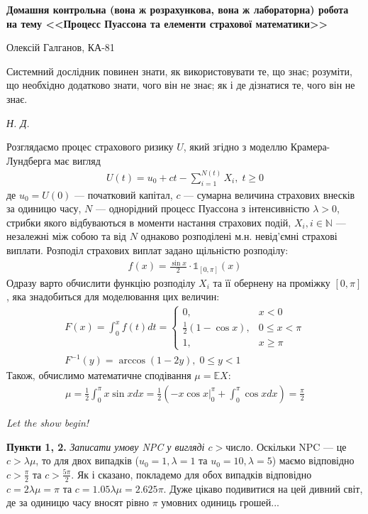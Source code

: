 \documentclass{extreport}
\newcommand{\E}{\mathbb{E}}
\newcommand{\N}{\mathbb{N}}
\newcommand{\task}[1]{\vspace{0.5em}\noindent\textbf{#1.}}
\begin{document}
\begin{center}
    \textbf{Домашня контрольна (вона ж розрахункова, вона ж лабораторна) робота \\
    на тему <<Процесс Пуассона та елементи страхової математики>>}

    Олексій Галганов, КА-81
\end{center}

\epigraph{
    Системний дослідник повинен знати, як використовувати те, що знає; 
    розуміти, що необхідно додатково знати, чого він не знає;
    як і де дізнатися те, чого він не знає.
}{\textit{Н. Д.}}

Розглядаємо процес страхового ризику $U$, який згідно з моделлю Крамера-Лундберга має вигляд
\begin{gather}
    U(t) = u_0 + ct - \sum_{i=1}^{N(t)} X_i, \; t \geq 0
\end{gather}
де $u_0 = U(0)$ --- початковий капітал, $c$ --- сумарна величина страхових внесків за одиницю часу,
$N$ --- однорідний процесс Пуассона з інтенсивністю $\lambda > 0$, стрибки якого відбуваються в моменти настання страхових подій,
$X_i, i \in \N$ --- незалежні між собою та від $N$ однаково розподілені м.н. невід'ємні страхові виплати. Розподіл страхових виплат задано
щільністю розподілу:
\begin{gather}
    f(x) = \frac{\sin x}{2} \cdot \mathds{1}_{[0,\pi]}(x)
\end{gather}
Одразу варто обчислити функцію розподілу $X_i$ та її обернену на проміжку $[0, \pi]$, яка знадобиться для моделювання цих величин:
\begin{gather}
    F(x) = \int_0^x f(t) dt = \begin{cases}
        0, & x < 0 \\
        \frac{1}{2} \left(1 - \cos x\right), & 0 \leq x < \pi \\
        1, & x \geq \pi
    \end{cases} \\
    F^{-1}(y) =  \arccos(1-2y), \; 0 \leq y < 1 
\end{gather}
Також, обчислимо математичне сподівання $\mu = \E X$:
\begin{gather*}
    \mu = \frac{1}{2}\int_0^\pi x \sin x dx = \frac{1}{2} \left(
        - \left. x \cos x \right|_0^\pi + \int_0^\pi \cos x dx
    \right) = \frac{\pi}{2}
\end{gather*}

\textit{Let the show begin!}
\newpage

\task{Пункти 1, 2} \emph{Записати умову NPC у вигляді $c > \text{число}$.} Оскільки NPC --- це $c > \lambda \mu$, то для
двох випадків ($u_0 = 1, \lambda = 1$ та $u_0 = 10, \lambda = 5$) маємо відповідно 
$c > \frac{\pi}{2}$ та $c > \frac{5\pi}{2}$. Як і сказано, покладемо для обох випадків відповідно
$c = 2 \lambda \mu = \pi$ та $c = 1.05 \lambda \mu = 2.625 \pi$. Дуже цікаво подивитися на цей дивний світ, де за одиницю часу
вносят рівно $\pi$ умовних одиниць грошей...
\end{document}
